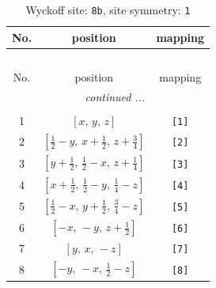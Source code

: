 \documentclass[fleqn,8pt]{jsarticle}
\begin{document}
\begin{longtable}{ccc}
\caption{Wyckoff site: {\tt 8b}, site symmetry: {\tt 1}}
 \\
 \hline \hline
No. & position & mapping \\ \hline \endfirsthead

\multicolumn{2}{l}{\tablename\ \thetable{}} \\
 \hline \hline
No. & position & mapping \\ \hline \endhead

 \hline \hline
\multicolumn{2}{r}{\footnotesize\it continued ...} \\ \endfoot

 \hline \hline
\multicolumn{2}{r}{} \\ \endlastfoot

1 & $\left[ x,\, y,\, z \right]$ & {\tt [1]} \\ \hline
2 & $\left[ \frac{1}{2} - y,\, x + \frac{1}{2},\, z + \frac{3}{4} \right]$ & {\tt [2]} \\ \hline
3 & $\left[ y + \frac{1}{2},\, \frac{1}{2} - x,\, z + \frac{1}{4} \right]$ & {\tt [3]} \\ \hline
4 & $\left[ x + \frac{1}{2},\, \frac{1}{2} - y,\, \frac{1}{4} - z \right]$ & {\tt [4]} \\ \hline
5 & $\left[ \frac{1}{2} - x,\, y + \frac{1}{2},\, \frac{3}{4} - z \right]$ & {\tt [5]} \\ \hline
6 & $\left[ - x,\, - y,\, z + \frac{1}{2} \right]$ & {\tt [6]} \\ \hline
7 & $\left[ y,\, x,\, - z \right]$ & {\tt [7]} \\ \hline
8 & $\left[ - y,\, - x,\, \frac{1}{2} - z \right]$ & {\tt [8]} \\
\end{longtable}
\end{document}
